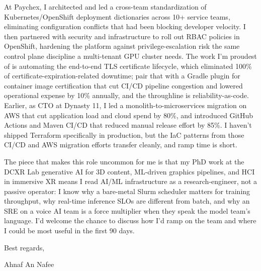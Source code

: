 \documentclass[letterpaper,11pt]{article}
\begin{document}
At Paychex, I architected and led a cross-team standardization of Kubernetes/OpenShift deployment dictionaries across 10+ service teams, eliminating configuration conflicts that had been blocking developer velocity. I then partnered with security and infrastructure to roll out RBAC policies in OpenShift, hardening the platform against privilege-escalation risk \textendash{} the same control plane discipline a multi-tenant GPU cluster needs. The work I'm proudest of is automating the end-to-end TLS certificate lifecycle, which eliminated 100\% of certificate-expiration-related downtime; pair that with a Gradle plugin for container image certification that cut CI/CD pipeline congestion and lowered operational expense by 10\% annually, and the throughline is reliability-as-code. Earlier, as CTO at Dynasty 11, I led a monolith-to-microservices migration on AWS that cut application load and cloud spend by 80\%, and introduced GitHub Actions and Maven CI/CD that reduced manual release effort by 85\%. I haven't shipped Terraform specifically in production, but the IaC patterns from those CI/CD and AWS migration efforts transfer cleanly, and ramp time is short.

The piece that makes this role uncommon for me is that my PhD work at the DCXR Lab \textendash{} generative AI for 3D content, ML-driven graphics pipelines, and HCI in immersive XR \textendash{} means I read AI/ML infrastructure as a research-engineer, not a passive operator: I know why a bare-metal Slurm scheduler matters for training throughput, why real-time inference SLOs are different from batch, and why an SRE on a voice AI team is a force multiplier when they speak the model team's language. I'd welcome the chance to discuss how I'd ramp on the team and where I could be most useful in the first 90 days.

Best regards,

\vspace{18pt}
Ahnaf An Nafee
\end{document}
